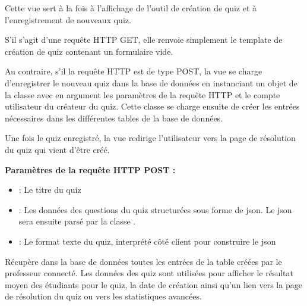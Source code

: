 \documentclass[a4paper,11pt,openany,oneside]{sphinxmanual}
\begin{document}
\begin{fulllineitems}
\label{source:quiz.views.create}
Cette vue sert à la fois à l'affichage de l'outil de création de quiz et à
l'enregistrement de nouveaux quiz.

S'il s'agit d'une requête HTTP GET, elle renvoie simplement le template de
création de quiz contenant un formulaire vide.

Au contraire, s'il la requête HTTP est de type POST, la vue se charge d'enregistrer
le nouveau quiz dans la base de données en instanciant un objet de la classe
{\hyperref[source:quiz.utils.save.SaveQuiz]{\emph{}}} avec en argument les paramètres de la requête HTTP et le compte
utilisateur du créateur du quiz. Cette
classe se charge ensuite de créer les entrées nécessaires dans les différentes tables de
la base de données.

Une fois le quiz enregistré, la vue redirige l'utilisateur vers la page de
résolution du quiz qui vient d'être créé.

\textbf{Paramètres de la requête HTTP POST :}
\begin{itemize}
\item {} 
 : Le titre du quiz

\item {} 
 : Les données des questions du quiz structurées sous forme de json. Le json sera ensuite parsé par la classe .

\item {} 
 : Le format texte du quiz, interprété côté client pour construire le json

\end{itemize}

\end{fulllineitems}


\begin{fulllineitems}
\label{source:quiz.views.created_quizzes}
Récupère dans la base de données toutes les entrées de la table  créées
par le professeur connecté. Les données des quiz sont utilisées pour afficher
le résultat moyen des étudiants pour le quiz, la date de création ainsi qu'un lien vers la page de
résolution du quiz ou vers les statistiques avancées.

\end{fulllineitems}
\end{document}

